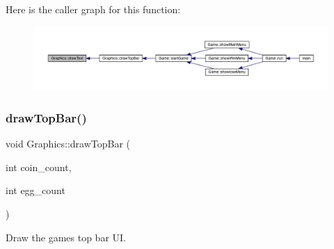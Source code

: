 Here is the caller graph for this function\+:
\nopagebreak
\begin{figure}[H]
\begin{center}
\leavevmode
\includegraphics[width=350pt]{class_graphics_a3b78a92ad6cd4daaa44291df5c5c3e55_icgraph}
\end{center}
\end{figure}
\mbox{\label{class_graphics_a91331c794ba21a860e8137b25df855dc}} 
\subsubsection{\texorpdfstring{draw\+Top\+Bar()}{drawTopBar()}}
{\footnotesize\ttfamily void Graphics\+::draw\+Top\+Bar (\begin{DoxyParamCaption}\item[{int}]{coin\+\_\+count,  }\item[{int}]{egg\+\_\+count }\end{DoxyParamCaption})}



Draw the game\textquotesingle{}s top bar UI. 


